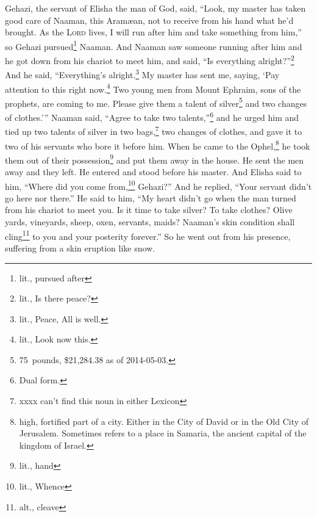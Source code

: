 \begin{inparaenum}
     Gehazi, the servant of Elisha the man of God, said, ``Look, my master has taken good care of Naaman, this Aram\ae{}an, not to receive from his hand what he'd brought. As the \textsc{Lord} lives, I will run after him and take something from him,''%
     so Gehazi pursued\footnote{lit., pursued after} Naaman. And Naaman saw someone running after him and he got down from his chariot to meet him, and said, ``Is everything alright?''\footnote{lit., Is there peace?}%
     And he said, ``Everything's alright.\footnote{lit., Peace, All is well.} My master has sent me, saying, `Pay attention to this right now.\footnote{lit., Look now this.} Two young men from Mount Ephraim, sons of the prophets, are coming to me. Please give them a talent of silver\footnote{75~pounds, \$21,284.38 as of 2014-05-03.} and two changes of clothes.'\thinspace''%
     Naaman said, ``Agree to take two talents,''\footnote{Dual form.} and he urged him and tied up two talents of silver in two bags,\footnote{xxxx can't find this noun in either Lexicon} two changes of clothes, and gave it to two of his servants who bore it before him.%
     When he came to the Ophel,\footnote{high, fortified part of a city. Either in the City of David or in the Old City of Jerusalem. Sometimes refers to a place in Samaria, the ancient capital of the kingdom of Israel.} he took them out of their possession\footnote{lit., hand} and put them away in the house. He sent the men away and they left.%
     He entered and stood before his master. And Elisha said to him, ``Where did you come from,\footnote{lit., Whence} Gehazi?'' And he replied, ``Your servant didn't go here nor there.''%
     He said to him, ``My heart didn't go when the man turned from his chariot to meet you.  Is it time to take silver? To take clothes? Olive yards, vineyards, sheep, oxen, servants, maids?%
     Naaman's skin condition shall cling\footnote{alt., cleave} to you and your posterity forever.'' So he went out from his presence, suffering from a skin eruption like snow.%
\end{inparaenum}
